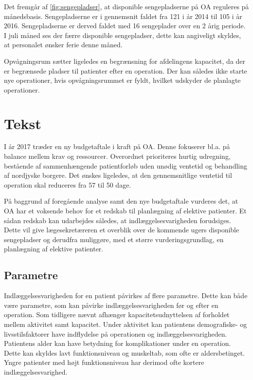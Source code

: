 Det fremgår af \ref{fig:sengepladser}, at disponible sengepladserne på OA reguleres på månedsbasis. Sengepladserne er i gennemsnit faldet fra 121 i år 2014 til 105 i år 2016. Sengepladserne er derved faldet med 16 sengeplader over en 2 årig periode. I juli måned ses der færre disponible sengepladser, dette kan angiveligt skyldes, at personalet ønsker ferie denne måned. 

Opvågningsrum sætter ligeledes en begrænsning for afdelingens kapacitet, da der er begrænsede pladser til patienter efter en operation. Der kan således ikke starte nye operationer, hvis opvågningsrummet er fyldt, hvilket udskyder de planlagte operationer. 

\section{Tekst}
I år 2017 træder en ny budgetaftale i kraft på OA. Denne fokuserer bl.a. på balance mellem krav og ressourcer. Overordnet prioriteres hurtig udregning, bestående af sammenhængende patientforløb uden unødig ventetid og behandling af nordjyske borgere. Det ønskes ligeledes, at den gennemsnitlige ventetid til operation skal reduceres fra 57 til 50 dage. 

På baggrund af foregående analyse samt den nye budgetaftale vurderes det, at OA har et voksende behov for et redskab til planlægning af elektive patienter. Et sådan redskab kan udarbejdes således, at indlæggelsesvarigheden forudsiges. Dette vil give lægesekretæreren et overblik over de kommende ugers  disponible sengepladser og derudfra muliggøre, med et større vurderingsgrundlag, en planlægning af elektive patienter.

\subsection{Parametre}
Indlæggelsesvarigheden for en patient påvirkes af flere parametre. Dette kan både være parametre, som kan påvirke indlæggelsesvarigheden før og efter en operation. Som tidligere nævnt afhænger kapacitetsudnyttelsen af forholdet mellem aktivitet samt kapacitet. Under aktivitet kan patientens demografiske- og livsstilsfaktorer have indflydelse på operationen og indlæggelsesvarigheden.
Patientens alder kan have betydning for komplikationer under en operation. Dette kan skyldes lavt funktionsniveau og muskeltab, som ofte er aldersbetinget. Yngre patienter med højt funktionsniveau har derimod ofte kortere indlæggelsesvarighed.\cite{Kehlet2001 Janssen2002} \\

